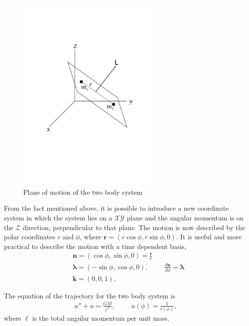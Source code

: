 \begin{figure}[htb!]
\centering
\includegraphics[width=7cm]{../Tesis/Capitulo0/Figures/Planofijo.pdf}
\caption{Plane of motion of the two body system}
\label{fig: tplanfijo}
\end{figure}

From the fact mentioned above, it is possible to introduce a new coordinate system in which the system lies on a $\mathcal{X}\mathcal{Y}$ plane and the angular momentum is on the $\mathcal{Z}$ direction, perpendicular to that plane. The motion is now described by the polar coordinates $r$ and $\phi$, where $\mathbf{r} = (r \cos\phi, r \sin\phi, 0)$. It is useful and more practical to describe the motion with a time dependent basis,
\begin{subequations}
\label{eq: timedependentbasisnopertur}
\begin{align}
&\mathbf{n} = (\cos\phi, \sin\phi,0)  = \frac{\mathbf{r}}{r}\\
&\boldsymbol{\lambda} = (-\sin\phi, \cos\phi,0), \hspace{1cm} \frac{d\mathbf{n}}{d\phi} = \boldsymbol{\lambda}\\
&\mathbf{k} = (0,0,1).
\end{align}
\end{subequations}


The equation of the trajectory for the two body system is
\begin{align}
u '' + u =\frac{GM}{\ell ^{\,2}}, \hspace{1cm} u(\phi) = \frac{1}{ r (\phi)},
\end{align}
where $\ell$ is the total angular momentum per unit mass.\\

